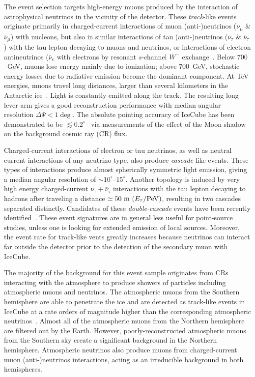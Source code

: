\documentclass[aps,10pt,prd,twocolumn,floats,letterpaper,showpacs,nofootinbib,bibnotes,notitlepage,superscriptaddress,floatfix]{revtex4-1}
\begin{document}
The event selection targets high-energy muons produced by the interaction of astrophysical neutrinos in the vicinity of the detector. These \emph{track}-like events originate primarily in charged-current interactions of muon (anti-)neutrinos ($\nu_\mu$ \& $\bar{\nu}_\mu$) with nucleons, but also in similar interactions of tau (anti-)neutrinos ($\nu_\tau$ \& $\bar{\nu}_\tau$) with the tau lepton decaying to muons and neutrinos, or interactions of electron antineutrinos ($\bar{\nu}_e$ with electrons by resonant $s$-channel $W^-$ exchange~\cite{Glashow:1960zz}. Below $700$~GeV, muons lose energy mainly due to ionization; above $700$~GeV, stochastic energy losses due to radiative emission become the dominant component. At TeV energies, muons travel long distances, larger than several kilometers in the Antarctic ice~\cite{Chirkin:2004hz}. Light is constantly emitted along the track. The resulting long lever arm gives a good reconstruction performance with median angular resolution $\Delta\Psi<1\deg$. The absolute pointing accuracy of IceCube has been demonstrated to be $\lesssim0.2^\circ$~\cite{Aartsen:2013zka} via measurements of the effect of the Moon shadow on the background cosmic ray (CR) flux. 

Charged-current interactions of electron or tau neutrinos, as well as neutral current interactions of any neutrino type, also produce \emph{cascade}-like events. These types of interactions produce almost spherically symmetric light emission, giving a median angular resolution of $\sim10^\circ$--$15^\circ$\cite{Aartsen:2017eiu}. Another topology is induced by very high energy charged-current $\nu_\tau+\bar{\nu}_\tau$ interactions with the tau lepton decaying to hadrons after traveling a distance $\simeq50~{\rm m}~(E_\tau/{\rm PeV})$, resulting in two cascades separated distinctly. Candidates of these \emph{double-cascade} events have been recently identified~\cite{Stachurska:2019wfb}. These event signatures are in general less useful for point-source studies, unless one is looking for extended emission of local sources. Moreover, the event rate for track-like vents greatly increases because neutrinos can interact far outside the detector prior to the detection of the secondary muon with IceCube.  

The majority of the background for this event sample originates from CRs interacting with the atmosphere to produce showers of particles including atmospheric muons and neutrinos. The atmospheric muons from the Southern hemisphere are able to penetrate the ice and are detected as track-like events in IceCube at a rate orders of magnitude higher than the corresponding atmospheric neutrinos~\cite{Aartsen:2016nxy}. Almost all of the atmospheric muons from the Northern hemisphere are filtered out by the Earth. However, poorly-reconstructed atmospheric muons from the Southern sky create a significant background in the Northern hemisphere.
Atmospheric neutrinos also produce muons from charged-current muon (anti-)neutrinos interactions, acting as an irreducible background in both hemispheres. 
\end{document}
